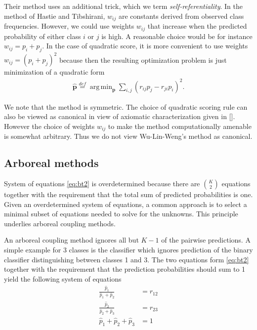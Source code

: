\documentclass[twoside,11pt]{article}
\DeclareMathOperator*{\argmin}{arg\,min}
\begin{document}
Their method uses an additional trick, which we term \emph{self-referentiality}. In the method of Hastie and Tibshirani, $w_{ij}$ are constants derived from observed class frequencies. However, we could use weights $w_{ij}$ that increase when the predicted probability of either class $i$ or $j$ is high. A reasonable choice would be for instance $w_{ij}= p_i + p_j$. In the case of quadratic score, it is more convenient to use weights $w_{ij} = (p_i + p_j)^2$ because then the resulting optimization problem is just minimization of a quadratic form
\begin{align*}
\hat{\boldsymbol{p}} \stackrel{def}{=} \argmin_{\boldsymbol{p}} \sum_{i,j} (r_{ij}p_j - r_{ji}p_i)^2.
\end{align*}

We note that the method is symmetric. The choice of quadratic scoring rule can also be viewed as canonical in view of axiomatic characterization given in  [\cite{selten1998axiomatic}].  However the choice of weights $w_{ij}$ to make the method computationally amenable is somewhat arbitrary. Thus we do not view Wu-Lin-Weng's method as canonical.

\subsection{Arboreal methods}

System of equations \eqref{eq:bt2} is overdetermined because there are $\binom{K}{2}$ equations together with the requirement that the total sum of predicted probabilities is one.  Given an overdetermined system of equations, a common approach is to select a minimal subset of equations needed to solve for the unknowns. This principle underlies arboreal coupling methods.

An arboreal coupling method ignores all but $K-1$ of the pairwise predictions. A simple example for 3 classes is the classifier which ignores prediction of the binary classifier distinguishing between classes 1 and 3. The two equations form \eqref{eq:bt2} together with the requirement that the prediction probabilities should sum to 1 yield the following system of equations
\begin{equation}
	\begin{split}
		\frac{\hat p_1}{\hat p_1 + \hat p_2} &= {r}_{12}\\
		\frac{\hat p_2}{\hat p_2 + \hat p_3} &= {r}_{23}\\
		\hat p_1 + \hat p_2 + \hat p_3 &= 1
	\end{split}
	\label{eq:arb1}
\end{equation}
\end{document}
